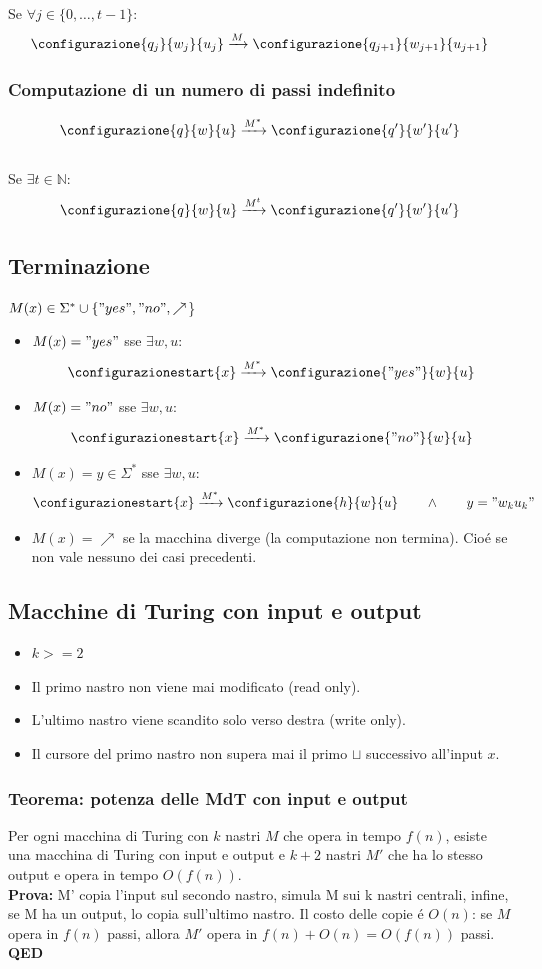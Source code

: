Se $\forall j \in \{0, \dots, t-1\} :$
\[
\configurazione{q_j}{w_j}{u_j}
\xrightarrow{M}
\configurazione{q_{j+1}}{w_{j+1}}{u_{j+1}}
\]

\subsubsection{Computazione di un numero di passi indefinito}
\[
\configurazione{q}{w}{u}
\xrightarrow{M^*}
\configurazione{q'}{w'}{u'}
\] \\

Se $\exists t \in \mathbb{N} :$
\[
\configurazione{q}{w}{u}
\xrightarrow{M^t}
\configurazione{q'}{w'}{u'}
\]

\subsection{Terminazione}
    $M(x) \in \Sigma^* \cup \{"yes", "no",\nearrow$\}
    \begin{itemize}
        \item $M(x) = "yes"$ sse $\exists w, u :$
        \[
        \configurazionestart{x} \xrightarrow{M^*} \configurazione{"yes"}{w}{u}
        \]
        \item $M(x) = "no"$ sse $\exists w, u :$
        \[
        \configurazionestart{x} \xrightarrow{M^*} \configurazione{"no"}{w}{u}
        \]
        \item $M(x) = y \in \Sigma^*$ sse $\exists w, u :$
        \[
        \configurazionestart{x} \xrightarrow{M^*} \configurazione{h}{w}{u} \qquad \land \qquad 
        y = "w_k u_k"
        \]
        \item $M(x) = \nearrow$ se la macchina diverge (la computazione non termina). Cioé se non vale nessuno dei casi precedenti.
	\end{itemize}


\subsection{Macchine di Turing con input e output}
\begin{itemize}
	\item $k >= 2$
	\item Il primo nastro non viene mai modificato (read only).
	\item L'ultimo nastro viene scandito solo verso destra (write only).
	\item Il cursore del primo nastro non supera mai il primo $\sqcup$ successivo all'input $x$.
\end{itemize}

\subsubsection{Teorema: potenza delle MdT con input e output}
Per ogni macchina di Turing con $k$ nastri $M$ che opera in tempo $f(n)$, esiste una macchina di Turing con input e output e $k+2$ nastri $M'$ che ha lo stesso output e opera in tempo $O(f(n))$. \\
\textbf{Prova:} M' copia l'input sul secondo nastro, simula M sui k nastri centrali, infine, se M ha un output, lo copia sull'ultimo nastro.  Il costo delle copie é $O(n)$: se $M$ opera in $f(n)$ passi, allora $M'$ opera in $f(n) + O(n) = O(f(n))$ passi. \textbf{QED}

